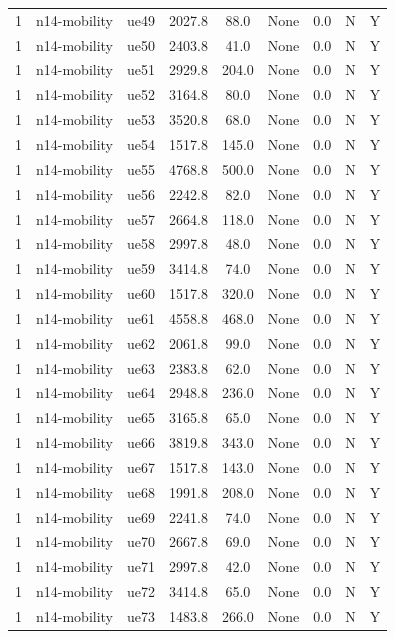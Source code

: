 \begin{table}[ht]
\begin{tabular}{|c|c|c|c|c|c|c|c|c|}
1 & n14-mobility & ue49 & 2027.8 & 88.0 & None & 0.0 & N & Y \\
1 & n14-mobility & ue50 & 2403.8 & 41.0 & None & 0.0 & N & Y \\
1 & n14-mobility & ue51 & 2929.8 & 204.0 & None & 0.0 & N & Y \\
1 & n14-mobility & ue52 & 3164.8 & 80.0 & None & 0.0 & N & Y \\
1 & n14-mobility & ue53 & 3520.8 & 68.0 & None & 0.0 & N & Y \\
1 & n14-mobility & ue54 & 1517.8 & 145.0 & None & 0.0 & N & Y \\
1 & n14-mobility & ue55 & 4768.8 & 500.0 & None & 0.0 & N & Y \\
1 & n14-mobility & ue56 & 2242.8 & 82.0 & None & 0.0 & N & Y \\
1 & n14-mobility & ue57 & 2664.8 & 118.0 & None & 0.0 & N & Y \\
1 & n14-mobility & ue58 & 2997.8 & 48.0 & None & 0.0 & N & Y \\
1 & n14-mobility & ue59 & 3414.8 & 74.0 & None & 0.0 & N & Y \\
1 & n14-mobility & ue60 & 1517.8 & 320.0 & None & 0.0 & N & Y \\
1 & n14-mobility & ue61 & 4558.8 & 468.0 & None & 0.0 & N & Y \\
1 & n14-mobility & ue62 & 2061.8 & 99.0 & None & 0.0 & N & Y \\
1 & n14-mobility & ue63 & 2383.8 & 62.0 & None & 0.0 & N & Y \\
1 & n14-mobility & ue64 & 2948.8 & 236.0 & None & 0.0 & N & Y \\
1 & n14-mobility & ue65 & 3165.8 & 65.0 & None & 0.0 & N & Y \\
1 & n14-mobility & ue66 & 3819.8 & 343.0 & None & 0.0 & N & Y \\
1 & n14-mobility & ue67 & 1517.8 & 143.0 & None & 0.0 & N & Y \\
1 & n14-mobility & ue68 & 1991.8 & 208.0 & None & 0.0 & N & Y \\
1 & n14-mobility & ue69 & 2241.8 & 74.0 & None & 0.0 & N & Y \\
1 & n14-mobility & ue70 & 2667.8 & 69.0 & None & 0.0 & N & Y \\
1 & n14-mobility & ue71 & 2997.8 & 42.0 & None & 0.0 & N & Y \\
1 & n14-mobility & ue72 & 3414.8 & 65.0 & None & 0.0 & N & Y \\
1 & n14-mobility & ue73 & 1483.8 & 266.0 & None & 0.0 & N & Y \\

\end{tabular}
\end{table}
